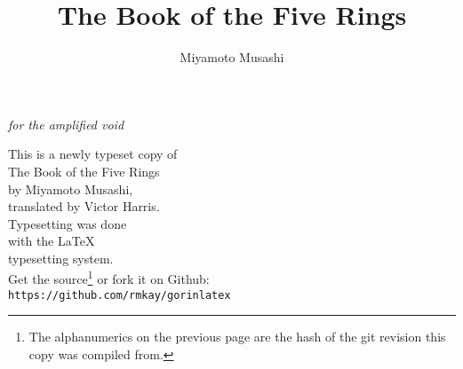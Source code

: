 \documentclass[paper=a6]{book}
\begin{document}
\pagestyle{empty}
\setcounter{secnumdepth}{-1} 
\setlength{\parindent}{0cm}




\vspace*{2cm}
\begin{center}
\textit{for the amplified void}
\end{center}
\cleardoublepage
\begin{figure}
\begin{alltt}
\singlespacing
\centering
\texttt{}
\end{alltt}
\end{figure}
\clearpage

\begin{center}
\vspace*{1cm}
This is a newly typeset copy of \\ 
The Book of the Five Rings\\ 
by Miyamoto Musashi,\\
translated by Victor Harris.\\
\vspace{2cm}
Typesetting was done \\ 
with the \LaTeX \\
typesetting system.\\
\vfill
Get the source\footnote{The alphanumerics on the previous page are the hash of the git revision this copy was compiled from.} or fork it on Github:\\
\texttt{https://github.com/rmkay/gorinlatex}\\


\end{center}

\title{\textbf{The Book of the Five Rings}}
\author{Miyamoto Musashi}
\date{}
\maketitle
\end{document}
